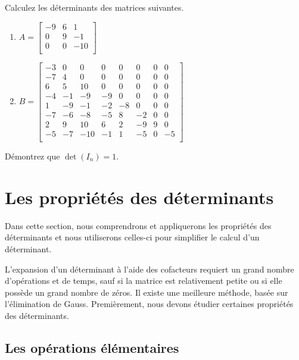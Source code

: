\documentclass[]{book}
\providecommand{\tightlist}{%
  \setlength{\itemsep}{0pt}\setlength{\parskip}{0pt}}
\theoremstyle{definition}
\theoremstyle{definition}
\theoremstyle{definition}
\theoremstyle{remark}
\let\BeginKnitrBlock\begin \let\EndKnitrBlock\end
\begin{document}
\BeginKnitrBlock{example}
\protect\hypertarget{exm:unnamed-chunk-98}{}{\label{exm:unnamed-chunk-98} }Calculez les déterminants des matrices suivantes.

\begin{enumerate}
\def\labelenumi{\alph{enumi}.}
\tightlist
\item
  \(A=\begin{bmatrix} -9&6&1\\ 0&9&-1\\ 0&0&-10\\ \end{bmatrix}\)
\item
  \(B=\begin{bmatrix} -3&0&0&0&0&0&0&0\\ -7&4&0&0&0&0&0&0\\ 6&5&10&0&0&0&0&0\\ -4&-1&-9&-9&0&0&0&0\\ 1&-9&-1&-2&-8&0&0&0\\ -7&-6&-8&-5&8&-2&0&0\\ 2&9&10&6&2&-9&9&0\\ -5&-7&-10&-1&1&-5&0&-5\\ \end{bmatrix}\)
\end{enumerate}
\EndKnitrBlock{example}

\BeginKnitrBlock{example}
\protect\hypertarget{exm:unnamed-chunk-99}{}{\label{exm:unnamed-chunk-99} }Démontrez que \(\det(I_n)=1\).
\EndKnitrBlock{example}

\hypertarget{les-proprietes-des-determinants}{%
\section{Les propriétés des déterminants}\label{les-proprietes-des-determinants}}

Dans cette section, nous comprendrons et appliquerons les propriétés des déterminants et nous utiliserons celles-ci pour simplifier le calcul d'un déterminant.

L'expansion d'un déterminant à l'aide des cofacteurs requiert un grand nombre d'opérations et de temps, sauf si la matrice est relativement petite ou si elle possède un grand nombre de zéros. Il existe une meilleure méthode, basée sur l'élimination de Gauss. Premièrement, nous devons étudier certaines propriétés des déterminants.

\hypertarget{les-operations-elementaires}{%
\subsection{Les opérations élémentaires}\label{les-operations-elementaires}}
\end{document}
